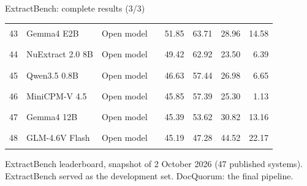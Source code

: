 \documentclass[aspectratio=169,10pt]{beamer}
\newcommand{\src}[1]{\par\vfill{\tiny\color{muted}#1\par}}
\begin{document}
\begin{frame}{ExtractBench: complete results (3/3)}
\begin{tabularx}{\textwidth}{@{}rYl@{\hspace{6pt}}lrrrr@{}}
43 & Gemma4 E2B & {\color{good}Open model} & \textcolor{good!45}{\rule{0.62cm}{1.05ex}} & 51.85 & 63.71 & 28.96 & 14.58\\
44 & NuExtract 2.0 8B & {\color{good}Open model} & \textcolor{good!45}{\rule{0.59cm}{1.05ex}} & 49.42 & 62.92 & 23.50 & 6.39\\
45 & Qwen3.5 0.8B & {\color{good}Open model} & \textcolor{good!45}{\rule{0.56cm}{1.05ex}} & 46.63 & 57.44 & 26.98 & 6.65\\
46 & MiniCPM-V 4.5 & {\color{good}Open model} & \textcolor{good!45}{\rule{0.55cm}{1.05ex}} & 45.85 & 57.39 & 25.30 & 1.13\\
47 & Gemma4 12B & {\color{good}Open model} & \textcolor{good!45}{\rule{0.54cm}{1.05ex}} & 45.39 & 53.62 & 30.82 & 13.16\\
48 & GLM-4.6V Flash & {\color{good}Open model} & \textcolor{good!45}{\rule{0.54cm}{1.05ex}} & 45.19 & 47.28 & 44.52 & 22.17\\
\bottomrule\end{tabularx}\endgroup

\src{ExtractBench leaderboard, snapshot of 2 October 2026 (47 published systems). ExtractBench served as the development set. DocQuorum: the final pipeline.}
\end{frame}
\end{document}

